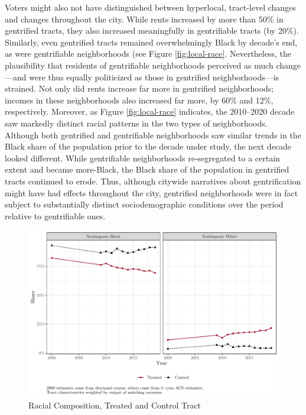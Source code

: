 \documentclass[
  12pt,
]{article}
\begin{document}
Voters might also not have distinguished between hyperlocal, tract-level changes and changes throughout the city. While rents increased by more than 50\% in gentrified tracts, they also increased meaningfully in gentrifiable tracts (by 20\%). Similarly, even gentrified tracts remained overwhelmingly Black by decade's end, as were gentrifiable neighborhoods (see Figure \ref{fig:local-race}. Nevertheless, the plausibility that residents of gentrifiable neighborhoods perceived as much change---and were thus equally politicized as those in gentrified neighborhoods---is strained. Not only did rents increase far more in gentrified neighborhoods; incomes in these neighborhoods also increased far more, by 60\% and 12\%, respectively. Moreover, as Figure \ref{fig:local-race} indicates, the 2010--2020 decade saw markedly distinct racial patterns in the two types of neighborhoods. Although both gentrified and gentrifiable neighborhoods saw similar trends in the Black share of the population prior to the decade under study, the next decade looked different. While gentrifiable neighborhoods re-segregated to a certain extent and became more-Black, the Black share of the population in gentrified tracts continued to erode. Thus, although citywide narratives about gentrification might have had effects throughout the city, gentrified neighborhoods were in fact subject to substantially distinct sociodemographic conditions over the period relative to gentrifiable ones.

\begin{figure}[H]

{\centering \includegraphics{gentrification_files/figure-latex/race-time-1} 

}

\caption{\label{fig:local-race}Racial Composition, Treated and Control Tract}\label{fig:race-time}
\end{figure}
\end{document}
